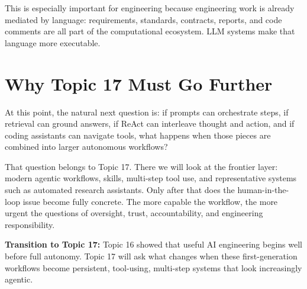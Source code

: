 \documentclass[12pt]{article}
\begin{document}
This is especially important for engineering because engineering work is already mediated by language: requirements, standards, contracts, reports, and code comments are all part of the computational ecosystem. LLM systems make that language more executable.

\section{Why Topic 17 Must Go Further}

At this point, the natural next question is: if prompts can orchestrate steps, if retrieval can ground answers, if ReAct can interleave thought and action, and if coding assistants can navigate tools, what happens when those pieces are combined into larger autonomous workflows?

That question belongs to Topic 17. There we will look at the frontier layer: modern agentic workflows, skills, multi-step tool use, and representative systems such as automated research assistants. Only after that does the human-in-the-loop issue become fully concrete. The more capable the workflow, the more urgent the questions of oversight, trust, accountability, and engineering responsibility.

\begin{alert-box}
\textbf{Transition to Topic 17:} Topic 16 showed that useful AI engineering begins well before full autonomy. Topic 17 will ask what changes when these first-generation workflows become persistent, tool-using, multi-step systems that look increasingly agentic.
\end{alert-box}
\end{document}
